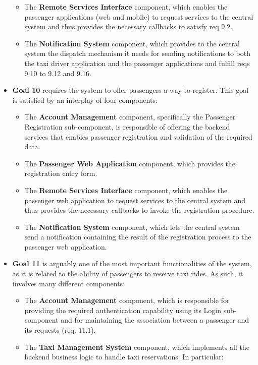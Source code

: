 \begin{itemize}
\begin{itemize}
		\item The \textbf{Remote Services Interface} component, which enables the passenger applications (web and mobile) to request services to the central system and thus provides the necessary callbacks to satisfy req 9.2.
		\item The \textbf{Notification System} component, which provides to the central system the dispatch mechanism it needs for sending notifications to both the taxi driver application and the passenger applications and fulfill reqs 9.10 to 9.12 and 9.16.
	\end{itemize}
	\item \textbf{Goal 10} requires the system to offer passengers a way to register. This goal is satisfied by an interplay of four components:
	\begin{itemize}
		\item The \textbf{Account Management} component, specifically the Passenger Registration sub-component, is responsible of offering the backend services that enables passenger registration and validation of the required data. 
		\item The \textbf{Passenger Web Application} component, which provides the registration entry form.
		\item The \textbf{Remote Services Interface} component, which enables the passenger web application to request services to the central system and thus provides the necessary callbacks to invoke the registration procedure.
		\item The \textbf{Notification System} component, which lets the central system send a notification containing the result of the registration process to the passenger web application.
	\end{itemize}
	\item \textbf{Goal 11} is arguably one of the most important functionalities of the system, as it is related to the ability of passengers to reserve taxi rides. As such, it involves many different components:
	\begin{itemize}
		\item The \textbf{Account Management} component, which is responsible for providing the required authentication capability using its Login sub-component and for maintaining the association between a passenger and its requests (req. 11.1).
		\item The \textbf{Taxi Management System} component, which implements all the backend business logic to handle taxi reservations. In particular:
		\begin{itemize}

\end{itemize}
\end{itemize}
\end{itemize}
